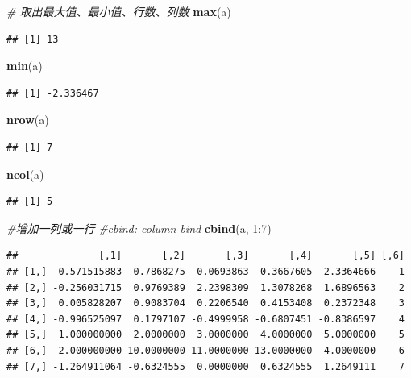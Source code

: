 \documentclass[]{article}
\newenvironment{Shaded}{\begin{snugshade}}{\end{snugshade}}
\newcommand{\KeywordTok}[1]{\textcolor[rgb]{0.13,0.29,0.53}{\textbf{{#1}}}}
\newcommand{\DecValTok}[1]{\textcolor[rgb]{0.00,0.00,0.81}{{#1}}}
\newcommand{\CommentTok}[1]{\textcolor[rgb]{0.56,0.35,0.01}{\textit{{#1}}}}
\newcommand{\NormalTok}[1]{{#1}}
\numberwithin{figure}{section}
\numberwithin{table}{section}
\theoremstyle{definition}
\theoremstyle{definition}
\theoremstyle{definition}
\theoremstyle{remark}
\begin{document}
\begin{Shaded}
\begin{Highlighting}[]
\CommentTok{# 取出最大值、最小值、行数、列数}
\KeywordTok{max}\NormalTok{(a)}
\end{Highlighting}
\end{Shaded}

\begin{verbatim}
## [1] 13
\end{verbatim}

\begin{Shaded}
\begin{Highlighting}[]
\KeywordTok{min}\NormalTok{(a)}
\end{Highlighting}
\end{Shaded}

\begin{verbatim}
## [1] -2.336467
\end{verbatim}

\begin{Shaded}
\begin{Highlighting}[]
\KeywordTok{nrow}\NormalTok{(a)}
\end{Highlighting}
\end{Shaded}

\begin{verbatim}
## [1] 7
\end{verbatim}

\begin{Shaded}
\begin{Highlighting}[]
\KeywordTok{ncol}\NormalTok{(a)}
\end{Highlighting}
\end{Shaded}

\begin{verbatim}
## [1] 5
\end{verbatim}

\begin{Shaded}
\begin{Highlighting}[]
\CommentTok{#增加一列或一行}
\CommentTok{#cbind: column bind}
\KeywordTok{cbind}\NormalTok{(a, }\DecValTok{1}\NormalTok{:}\DecValTok{7}\NormalTok{)}
\end{Highlighting}
\end{Shaded}

\begin{verbatim}
##              [,1]       [,2]       [,3]       [,4]       [,5] [,6]
## [1,]  0.571515883 -0.7868275 -0.0693863 -0.3667605 -2.3364666    1
## [2,] -0.256031715  0.9769389  2.2398309  1.3078268  1.6896563    2
## [3,]  0.005828207  0.9083704  0.2206540  0.4153408  0.2372348    3
## [4,] -0.996525097  0.1797107 -0.4999958 -0.6807451 -0.8386597    4
## [5,]  1.000000000  2.0000000  3.0000000  4.0000000  5.0000000    5
## [6,]  2.000000000 10.0000000 11.0000000 13.0000000  4.0000000    6
## [7,] -1.264911064 -0.6324555  0.0000000  0.6324555  1.2649111    7
\end{verbatim}
\end{document}
